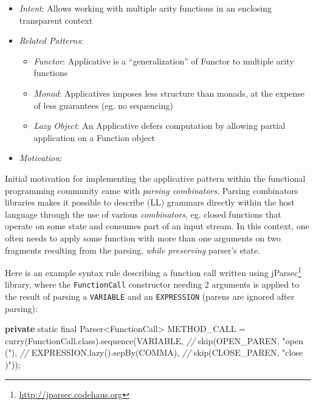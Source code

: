 \documentclass[11pt,]{article}
\newenvironment{Shaded}{}{}
\newcommand{\KeywordTok}[1]{\textcolor[rgb]{0.00,0.44,0.13}{\textbf{{#1}}}}
\newcommand{\DataTypeTok}[1]{\textcolor[rgb]{0.56,0.13,0.00}{{#1}}}
\newcommand{\StringTok}[1]{\textcolor[rgb]{0.25,0.44,0.63}{{#1}}}
\newcommand{\CommentTok}[1]{\textcolor[rgb]{0.38,0.63,0.69}{\textit{{#1}}}}
\newcommand{\FunctionTok}[1]{\textcolor[rgb]{0.02,0.16,0.49}{{#1}}}
\newcommand{\NormalTok}[1]{{#1}}
\renewcommand{\href}[2]{#2\footnote{\url{#1}}}
\begin{document}
\begin{itemize}
\item
  \emph{Intent}: Allows working with multiple arity functions in an
  enclosing transparent context
\item
  \emph{Related Patterns}:

  \begin{itemize}
  \item
    \emph{Functor}: Applicative is a ``generalization'' of Functor to
    multiple arity functions
  \item
    \emph{Monad}: Applicatives imposes less structure than monads, at
    the expense of less guarantees (eg. no sequencing)
  \item
    \emph{Lazy Object}: An Applicative defers computation by allowing
    partial application on a Function object
  \end{itemize}
\item
  \emph{Motivation}:
\end{itemize}

Initial motivation for implementing the applicative pattern within the
functional programming community came with \emph{parsing combinators}.
Parsing combinators libraries makes it possible to describe (LL)
grammars directly within the host language through the use of various
\emph{combinators}, eg. closed functions that operate on some state and
consumes part of an input stream. In this context, one often needs to
apply some function with more than one arguments on two fragments
resulting from the parsing, \emph{while preserving} parser's state.

Here is an example syntax rule describing a function call written using
\href{http://jparsec.codehaus.org}{jParsec} library, where the
\texttt{FunctionCall} constructor needing 2 arguments is applied to the
result of parsing a \texttt{VARIABLE} and an \texttt{EXPRESSION} (parens
are ignored after parsing):

\begin{Shaded}
\begin{Highlighting}[]
\KeywordTok{private} \DataTypeTok{static} \DataTypeTok{final} \NormalTok{Parser<FunctionCall> METHOD_CALL = }
        \FunctionTok{curry}\NormalTok{(FunctionCall.}\FunctionTok{class}\NormalTok{).}\FunctionTok{sequence}\NormalTok{(VARIABLE, }\CommentTok{//}
            \FunctionTok{skip}\NormalTok{(OPEN_PAREN, }\StringTok{"open ("}\NormalTok{), }\CommentTok{//}
            \NormalTok{EXPRESSION.}\FunctionTok{lazy}\NormalTok{().}\FunctionTok{sepBy}\NormalTok{(COMMA), }\CommentTok{//}
            \FunctionTok{skip}\NormalTok{(CLOSE_PAREN, }\StringTok{"close )"}\NormalTok{));}
\end{Highlighting}
\end{Shaded}
\end{document}
